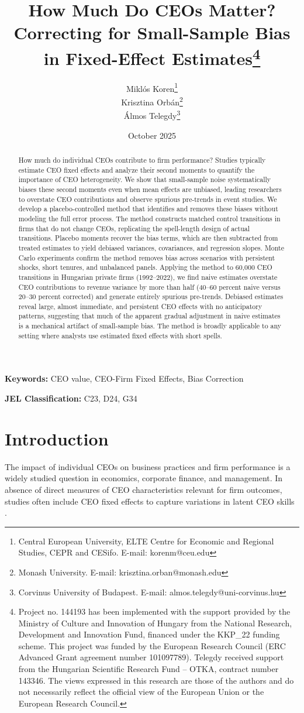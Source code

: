 \documentclass[11pt,a4paper]{article}
\title{How Much Do CEOs Matter? Correcting for Small-Sample Bias in Fixed-Effect Estimates\thanks{Project no. 144193 has been implemented with the support provided by the Ministry of Culture and Innovation of Hungary from the National Research, Development and Innovation Fund, financed under the KKP\_22 funding scheme. This project was funded by the European Research Council (ERC Advanced Grant agreement number 101097789). Telegdy received support from the Hungarian Scientific Research Fund – OTKA, contract number 143346. The views expressed in this research are those of the authors and do not necessarily reflect the official view of the European Union or the European Research Council.}}
\author{Miklós Koren\thanks{Central European University, ELTE Centre for Economic and Regional Studies, CEPR and CESifo. E-mail: korenm@ceu.edu} \\
        Krisztina Orbán\thanks{Monash University. E-mail: krisztina.orban@monash.edu} \\
        Álmos Telegdy\thanks{Corvinus University of Budapest. E-mail: almos.telegdy@uni-corvinus.hu}}
\date{October 2025}
\begin{document}
\maketitle
\thispagestyle{empty}

\begin{abstract}
How much do individual CEOs contribute to firm performance? Studies typically estimate CEO fixed effects and analyze their second moments to quantify the importance of CEO heterogeneity. We show that small-sample noise systematically biases these second moments even when mean effects are unbiased, leading researchers to overstate CEO contributions and observe spurious pre-trends in event studies. We develop a placebo-controlled method that identifies and removes these biases without modeling the full error process. The method constructs matched control transitions in firms that do not change CEOs, replicating the spell-length design of actual transitions. Placebo moments recover the bias terms, which are then subtracted from treated estimates to yield debiased variances, covariances, and regression slopes. Monte Carlo experiments confirm the method removes bias across scenarios with persistent shocks, short tenures, and unbalanced panels. Applying the method to 60,000 CEO transitions in Hungarian private firms (1992--2022), we find naive estimates overstate CEO contributions to revenue variance by more than half (40--60 percent naive versus 20--30 percent corrected) and generate entirely spurious pre-trends. Debiased estimates reveal large, almost immediate, and persistent CEO effects with no anticipatory patterns, suggesting that much of the apparent gradual adjustment in naive estimates is a mechanical artifact of small-sample bias. The method is broadly applicable to any setting where analysts use estimated fixed effects with short spells.
\end{abstract}

\textbf{Keywords:} CEO value, CEO-Firm Fixed Effects, Bias Correction

\textbf{JEL Classification:} C23, D24, G34

\clearpage
\setcounter{page}{1}

\section{Introduction}

The impact of individual CEOs on business practices and firm performance is a widely studied question in economics, corporate finance, and management. In absence of direct measures of CEO characteristics relevant for firm outcomes, studies often include CEO fixed effects to capture variations in latent CEO skills \citep{Bertrand2003-io, crossland2011differences, quigley2015has}. 
\end{document}
